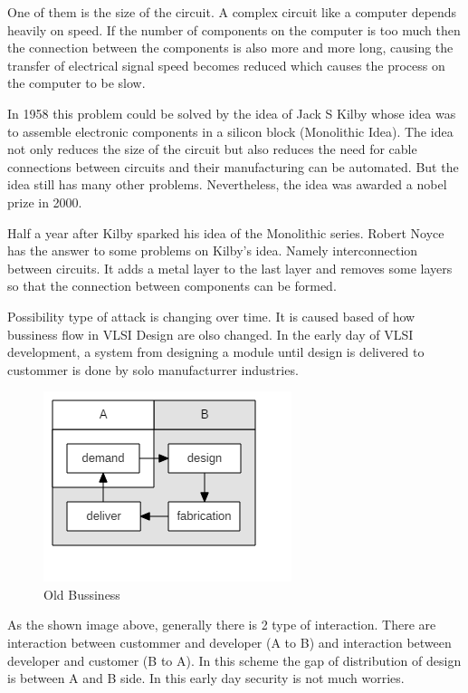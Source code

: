\documentclass[10pt,journal,compsoc,letterpaper,final]{IEEEtran}
\begin{document}
One of them is the size of the circuit. A complex circuit like a computer depends heavily on speed. If the number of components on the computer is too much then the connection between the components is also more and more long, causing the transfer of electrical signal speed becomes reduced which causes the process on the computer to be slow.

In 1958 this problem could be solved by the idea of ​​Jack S Kilby whose idea was to assemble electronic components in a silicon block (Monolithic Idea). The idea not only reduces the size of the circuit but also reduces the need for cable connections between circuits and their manufacturing can be automated. But the idea still has many other problems. Nevertheless, the idea was awarded a nobel prize in 2000.

Half a year after Kilby sparked his idea of ​​the Monolithic series. Robert Noyce has the answer to some problems on Kilby's idea. Namely interconnection between circuits. It adds a metal layer to the last layer and removes some layers so that the connection between components can be formed.

Possibility type of attack is changing over time. It is caused based of how bussiness flow in VLSI Design are olso changed. In the early day of VLSI development, a system from designing a module until design is delivered to custommer is done by solo manufacturrer industries.

\begin{figure}
	\centering
	\includegraphics[scale=0.5]{images/oldBusinessLSI}
	\caption{Old Bussiness}
	\label{oldb}
\end{figure}

As the shown image above, generally there is 2 type of interaction. There are interaction between custommer and developer (A to B) and interaction between developer and customer (B to A). In this scheme the gap of distribution of design is between A and B side. In this early day security is not much worries.
\end{document}
